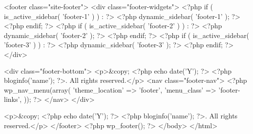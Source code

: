 <footer class="site-footer">
    <div class="footer-widgets">
        <?php if ( is_active_sidebar( 'footer-1' ) ) : ?>
            <?php dynamic_sidebar( 'footer-1' ); ?>
        <?php endif; ?>
        <?php if ( is_active_sidebar( 'footer-2' ) ) : ?>
            <?php dynamic_sidebar( 'footer-2' ); ?>
        <?php endif; ?>
        <?php if ( is_active_sidebar( 'footer-3' ) ) : ?>
            <?php dynamic_sidebar( 'footer-3' ); ?>
        <?php endif; ?>
    </div>

    <div class="footer-bottom">
        <p>&copy; <?php echo date('Y'); ?> <?php bloginfo('name'); ?>. All rights reserved.</p>
        <nav class="footer-nav">
            <?php
                wp_nav_menu(array(
                    'theme_location' => 'footer',
                    'menu_class'     => 'footer-links',
                ));
            ?>
        </nav>
    </div>

    <p>&copy; <?php echo date('Y'); ?> <?php bloginfo('name'); ?>. All rights reserved.</p>
</footer>
<?php wp_footer(); ?>
</body>
</html>
